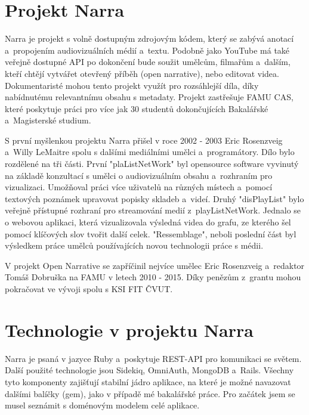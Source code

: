 \section{Projekt Narra}
\par Narra je projekt s volně dostupným zdrojovým kódem, který se zabývá anotací a~propojením audiovizuálních médií a~textu. Podobně jako YouTube má také veřejně dostupné API po dokončení bude soužit umělcům, filmařům a~dalším, kteří chtějí vytvářet otevřený příběh (open narrative), nebo editovat videa. Dokumentaristé mohou tento projekt využít pro rozsáhlejší díla, díky nabídnutému relevantnímu obsahu s metadaty. Projekt zastřešuje FAMU CAS, které poskytuje práci pro více jak 30 studentů dokončujících Bakalářské a~Magisterské studium.
\par S první myšlenkou projektu Narra přišel v roce 2002 - 2003 Eric Rosenzveig a~Willy LeMaitre spolu s dalšími mediálními umělci a~programátory. Dílo bylo rozdělené na tři části. První "plaListNetWork" byl opensource software vyvinutý na základě konzultací s umělci o audiovizuálním obsahu a~rozhraním pro vizualizaci. Umožňoval práci více uživatelů na různých místech a~pomocí textových poznámek upravovat popisky skladeb a~videí. Druhý "disPlayList" bylo veřejně přístupné rozhraní pro streamování medií z~playListNetWork. Jednalo se o webovou aplikaci, která vizualizovala výsledná videa do grafu, ze kterého šel pomocí klíčových slov tvořit další celek. "Ressemblage", neboli poslední část byl výsledkem práce umělců používajících novou technologii práce s médii.
\par V projekt Open Narrative se zapříčinil nejvíce umělec Eric Rosenzveig a~redaktor Tomáš Dobruška na FAMU v letech 2010 - 2015. Díky penězům z~grantu mohou pokračovat ve vývoji spolu s KSI FIT ČVUT.

\section{Technologie v projektu Narra} 
\par Narra je psaná v jazyce Ruby a~poskytuje REST-API pro komunikaci se světem. Další použité technologie jsou Sidekiq, OmniAuth, MongoDB a~Rails. Všechny tyto komponenty zajišťují stabilní jádro aplikace, na které je možné navazovat dalšími balíčky (gem), jako v případě mé bakalářské práce. Pro začátek jsem se musel seznámit s doménovým modelem celé aplikace.


